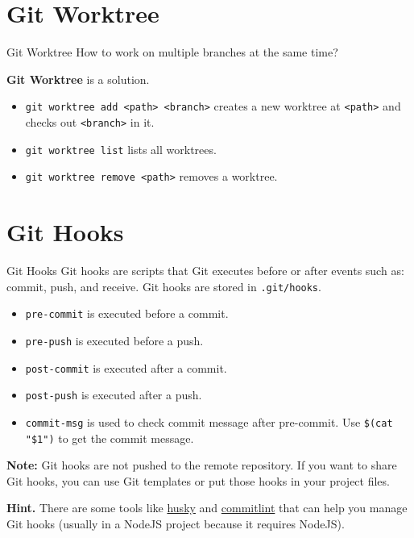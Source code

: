 \documentclass[aspectratio=169]{beamer}
\begin{document}
\section{Git Worktree}

\begin{frame}{Git Worktree}
    How to work on multiple branches at the same time?

    \bigskip

    \pause

    \textbf{Git Worktree} is a solution.

    \pause

    \begin{itemize}
        \item \texttt{git worktree add <path> <branch>} creates a new worktree at \texttt{<path>} and checks out \texttt{<branch>} in it.
        \item \texttt{git worktree list} lists all worktrees.
        \item \texttt{git worktree remove <path>} removes a worktree.
    \end{itemize}

\end{frame}

\section{Git Hooks}

\begin{frame}{Git Hooks}
    Git hooks are scripts that Git executes before or after events such as: commit, push, and receive. Git hooks are stored in \texttt{.git/hooks}.
    \begin{itemize}
        \item \texttt{pre-commit} is executed before a commit.
        \item \texttt{pre-push} is executed before a push.
        \item \texttt{post-commit} is executed after a commit.
        \item \texttt{post-push} is executed after a push.
        \item \texttt{commit-msg} is used to check commit message after pre-commit. Use \texttt{\$(cat "\$1")} to get the commit message.
    \end{itemize}

    \pause

    \textbf{Note:} Git hooks are not pushed to the remote repository. If you want to share Git hooks, you can use Git templates or put those hooks in your project files.

    \pause
    \medskip

    \textbf{Hint.} There are some tools like \href{https://typicode.github.io/husky/}{husky} and \href{https://commitlint.js.org/}{commitlint} that can help you manage Git hooks (usually in a NodeJS project because it requires NodeJS).
\end{frame}
\end{document}

